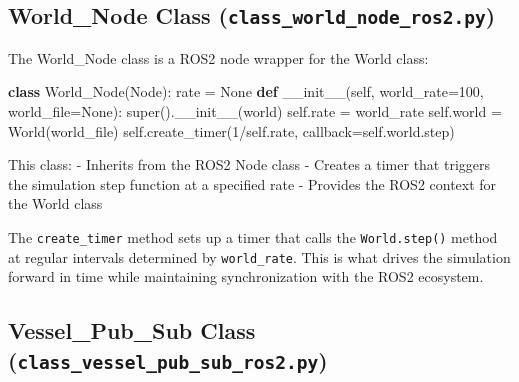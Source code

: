 \documentclass[
  letterpaper,
  DIV=11,
  numbers=noendperiod]{scrreprt}
\newenvironment{Shaded}{\begin{snugshade}}{\end{snugshade}}
\newcommand{\BuiltInTok}[1]{\textcolor[rgb]{0.00,0.23,0.31}{#1}}
\newcommand{\DecValTok}[1]{\textcolor[rgb]{0.68,0.00,0.00}{#1}}
\newcommand{\FunctionTok}[1]{\textcolor[rgb]{0.28,0.35,0.67}{#1}}
\newcommand{\KeywordTok}[1]{\textcolor[rgb]{0.00,0.23,0.31}{\textbf{#1}}}
\newcommand{\NormalTok}[1]{\textcolor[rgb]{0.00,0.23,0.31}{#1}}
\newcommand{\OperatorTok}[1]{\textcolor[rgb]{0.37,0.37,0.37}{#1}}
\newcommand{\StringTok}[1]{\textcolor[rgb]{0.13,0.47,0.30}{#1}}
\newcommand{\VariableTok}[1]{\textcolor[rgb]{0.07,0.07,0.07}{#1}}
\begin{document}
\subsection*{\texorpdfstring{World\_Node Class
(\texttt{class\_world\_node\_ros2.py})}{World\_Node Class (class\_world\_node\_ros2.py)}}\label{world_node-class-class_world_node_ros2.py}

The World\_Node class is a ROS2 node wrapper for the World class:

\begin{Shaded}
\begin{Highlighting}[]
\KeywordTok{class}\NormalTok{ World\_Node(Node):}
\NormalTok{    rate }\OperatorTok{=} \VariableTok{None}
    \KeywordTok{def} \FunctionTok{\_\_init\_\_}\NormalTok{(}\VariableTok{self}\NormalTok{, world\_rate}\OperatorTok{=}\DecValTok{100}\NormalTok{, world\_file}\OperatorTok{=}\VariableTok{None}\NormalTok{):}
        \BuiltInTok{super}\NormalTok{().}\FunctionTok{\_\_init\_\_}\NormalTok{(}\StringTok{\textquotesingle{}world\textquotesingle{}}\NormalTok{)}
        \VariableTok{self}\NormalTok{.rate }\OperatorTok{=}\NormalTok{ world\_rate}
        \VariableTok{self}\NormalTok{.world }\OperatorTok{=}\NormalTok{ World(world\_file)}
        \VariableTok{self}\NormalTok{.create\_timer(}\DecValTok{1}\OperatorTok{/}\VariableTok{self}\NormalTok{.rate, callback}\OperatorTok{=}\VariableTok{self}\NormalTok{.world.step)}
\end{Highlighting}
\end{Shaded}

This class: - Inherits from the ROS2 Node class - Creates a timer that
triggers the simulation step function at a specified rate - Provides the
ROS2 context for the World class

The \texttt{create\_timer} method sets up a timer that calls the
\texttt{World.step()} method at regular intervals determined by
\texttt{world\_rate}. This is what drives the simulation forward in time
while maintaining synchronization with the ROS2 ecosystem.

\subsection*{\texorpdfstring{Vessel\_Pub\_Sub Class
(\texttt{class\_vessel\_pub\_sub\_ros2.py})}{Vessel\_Pub\_Sub Class (class\_vessel\_pub\_sub\_ros2.py)}}\label{vessel_pub_sub-class-class_vessel_pub_sub_ros2.py}
\end{document}
